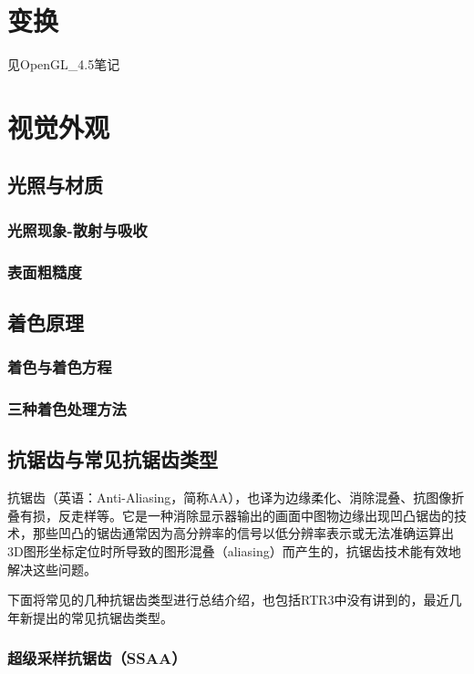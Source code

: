 \documentclass[UTF8,a4paper,12pt]{ctexbook}
\begin{document}
		
\chapter{变换}
	见OpenGL\_4.5笔记


\chapter{视觉外观}
	\section{光照与材质}
		\subsection{光照现象-散射与吸收}
		
		\subsection{表面粗糙度}
		
	\section{着色原理}
		\subsection{着色与着色方程}
		
		\subsection{三种着色处理方法}
		
		
	\section{抗锯齿与常见抗锯齿类型}
		抗锯齿（英语：Anti-Aliasing，简称AA），也译为边缘柔化、消除混叠、抗图像折叠有损，反走样等。它是一种消除显示器输出的画面中图物边缘出现凹凸锯齿的技术，那些凹凸的锯齿通常因为高分辨率的信号以低分辨率表示或无法准确运算出3D图形坐标定位时所导致的图形混叠（aliasing）而产生的，抗锯齿技术能有效地解决这些问题。
		
		下面将常见的几种抗锯齿类型进行总结介绍，也包括RTR3中没有讲到的，最近几年新提出的常见抗锯齿类型。
		
		\subsection{超级采样抗锯齿（SSAA）}
		
\end{document}
